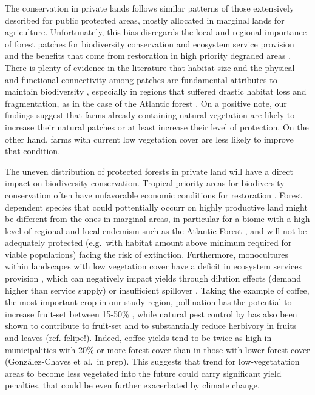 \documentclass[
	12pt,				%
	oneside,			%
	a4paper,			%
	chapter=TITLE,		%
	section=TITLE,		%
	brazil,			%
	english				%
	]{abntex2}
\begin{document}
The conservation in private lands follows similar patterns of those extensively described for public protected areas, mostly allocated in marginal lands for agriculture. Unfortunately, this bias disregards the local and regional importance of forest patches for biodiversity conservation and ecosystem service provision and the benefits that come from restoration in high priority degraded areas \autocite{brancalion_global_2019,metzger_why_2019}. There is plenty of evidence in the literature that habitat size and the physical and functional connectivity among patches are fundamental attributes to maintain biodiversity \autocite{boscolo_isolation_2011,martensen_associations_2012,uroy_effect_2019}, especially in regions that suffered drastic habitat loss and fragmentation, as in the case of the Atlantic forest \autocite{joly_experiences_2014}. On a positive note, our findings suggest that farms already containing natural vegetation are likely to increase their natural patches or at least increase their level of protection. On the other hand, farms with current low vegetation cover are less likely to improve that condition.

The uneven distribution of protected forests in private land will have a direct impact on biodiversity conservation. Tropical priority areas for biodiversity conservation often have unfavorable economic conditions for restoration \autocite{brancalion_global_2019}. Forest dependent species that could pottentially occurr on highly productive land might be different from the ones in marginal areas, in particular for a biome with a high level of regional and local endemism such as the Atlantic Forest \autocite{mittermeier_global_2011}, and will not be adequately protected (e.g.~with habitat amount above minimum required for viable populations) facing the risk of extinction. Furthermore, monocultures within landscapes with low vegetation cover have a deficit in ecosystem services provision \autocite{dainese_global_2019}, which can negatively impact yields through dilution effects (demand higher than service supply) or insufficient spillover \autocite{tscharntke_landscape_2012}. Taking the example of coffee, the most important crop in our study region, pollination has the potential to increase fruit-set between 15-50\% \autocite{ricketts_economic_2004,saturni_landscape_2016}, while natural pest control by has also been shown to contribute to fruit-set \autocite{aristizabal_landscape_2019,classen_complementary_2014} and to substantially reduce herbivory in fruits and leaves (ref. felipe!). Indeed, coffee yields tend to be twice as high in municipalities with 20\% or more forest cover than in those with lower forest cover (González-Chaves et al.~in prep). This suggests that trend for low-vegetatation areas to become less vegetated into the future could carry significant yield penalties, that could be even further exacerbated by climate change.
\end{document}
